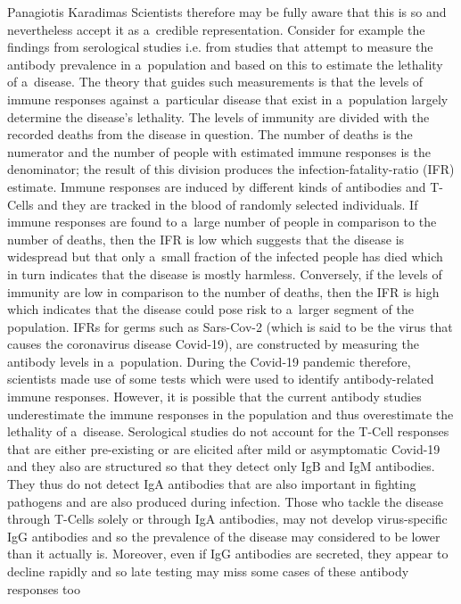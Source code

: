 \begin{artengenv}{Panagiotis Karadimas}
 Scientists therefore may be fully aware that this is so and nevertheless accept it as a~credible representation. Consider for example the findings from serological studies i.e. from studies that attempt to measure the antibody prevalence in a~population and based on this to estimate the lethality of a~disease. The theory that guides such measurements is that the levels of immune responses against a~particular disease that exist in a~population largely determine the disease's lethality. The levels of immunity are divided with the recorded deaths from the disease in question. The number of deaths is the numerator and the number of people with estimated immune responses is the denominator; the result of this division produces the infection-fatality-ratio (IFR) estimate. Immune responses are induced by different kinds of antibodies and T-Cells and they are tracked in the blood of randomly selected individuals. If immune responses are found to a~large number of people in comparison to the number of deaths, then the IFR is low which suggests that the disease is widespread but that only a~small fraction of the infected people has died which in turn indicates that the disease is mostly harmless. Conversely, if the levels of immunity are low in comparison to the number of deaths, then the IFR is high which indicates that the disease could pose risk to a~larger segment of the population. IFRs for germs such as Sars-Cov-2 (which is said to be the virus that causes the coronavirus disease Covid-19), are constructed by measuring the antibody levels in a~population. During the Covid-19 pandemic therefore, scientists made use of some tests which were used to identify antibody-related immune responses. However, it is possible that the current antibody studies underestimate the immune responses in the population and thus overestimate the lethality of a~disease. Serological studies do not account for the T-Cell responses that are either pre-existing or are elicited after mild or asymptomatic Covid-19 and they also are structured so that they detect only IgB and IgM antibodies. They thus do not detect IgA antibodies that are also important in fighting pathogens and are also produced during infection. Those who tackle the disease through T-Cells solely or through IgA antibodies, may not develop virus-specific IgG antibodies and so the prevalence of the disease may considered to be lower than it actually is. Moreover, even if IgG antibodies are secreted, they appear to decline rapidly and so late testing may miss some cases of these antibody responses too 

\end{artengenv}
